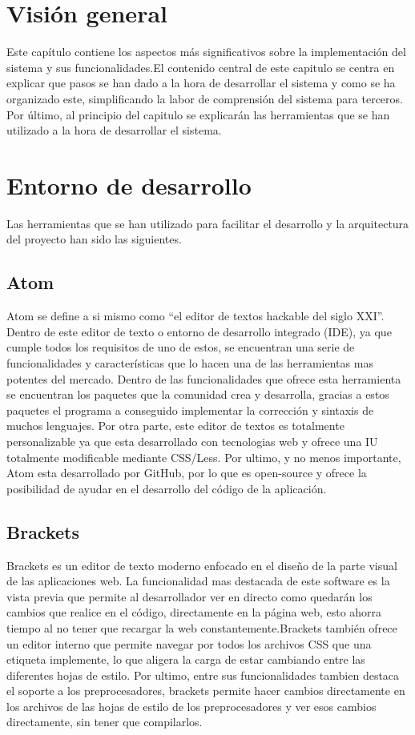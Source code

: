 \section{Visión general}
Este capítulo contiene los aspectos más significativos sobre la implementación del sistema y sus funcionalidades.El contenido central de este capitulo se centra en explicar que pasos se han dado a la hora de desarrollar el sistema y como se ha organizado este, simplificando la labor de comprensión del sistema para terceros. Por último, al principio del capitulo se explicarán las herramientas que se han utilizado a la hora de desarrollar el sistema. 
\section{Entorno de desarrollo}
Las herramientas que se han utilizado para facilitar el desarrollo y la arquitectura del proyecto han sido las siguientes.

\subsection{Atom}
Atom\cite{atom} se define a si mismo como ``el editor de textos hackable del siglo XXI''. Dentro de este editor de texto o entorno de desarrollo integrado (IDE), ya que cumple todos los requisitos de uno de estos, se encuentran una serie de funcionalidades y características que lo hacen una de las herramientas mas potentes del mercado. Dentro de las funcionalidades que ofrece esta herramienta se encuentran los paquetes que la comunidad crea y desarrolla, gracias a estos paquetes el programa a conseguido implementar la corrección y sintaxis de muchos lenguajes. Por otra parte, este editor de textos es totalmente personalizable ya que esta desarrollado con tecnologias web y ofrece una IU totalmente modificable mediante CSS/Less. Por ultimo, y no menos importante, Atom esta desarrollado por GitHub, por lo que es open-source y ofrece la posibilidad de ayudar en el desarrollo del código de la aplicación.

\subsection{Brackets}
Brackets\cite{brackets} es un editor de texto moderno enfocado en el diseño de la parte visual de las aplicaciones web. La funcionalidad mas destacada de este software es la vista previa que permite al desarrollador ver en directo como quedarán los cambios que realice en el código, directamente en la página web, esto ahorra tiempo al no tener que recargar la web constantemente.Brackets también ofrece un editor interno que permite navegar por todos los archivos CSS que una etiqueta implemente, lo que aligera la carga de estar cambiando entre las diferentes hojas de estilo. Por ultimo, entre sus funcionalidades tambien destaca el soporte a los preprocesadores, brackets permite hacer cambios directamente en los archivos de las hojas de estilo de los preprocesadores y ver esos cambios directamente, sin tener que compilarlos.

